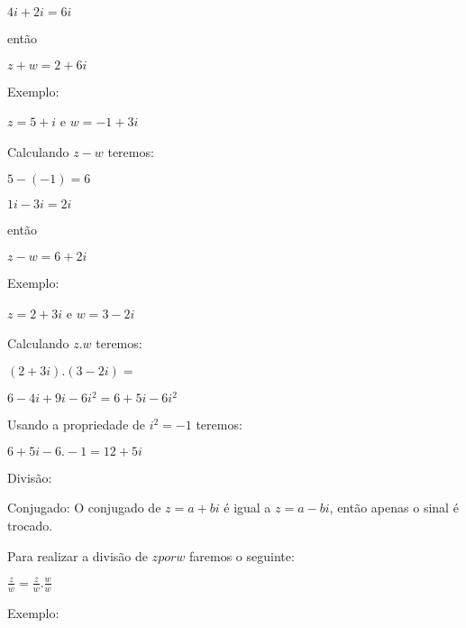 \documentclass[]{article}
\begin{document}
\begin{large}
\begin{flushleft}
\begin{center}
    $4i + 2i = 6i$
    
    então
    
    $z+w = 2+6i$
\end{center}

Exemplo: \vspace{.3cm}

\begin{center}
    $z = 5+i$ e $w = -1+3i$
\end{center}

Calculando $z-w$ teremos: \vspace{.3cm}

\begin{center}
    $5-(-1) = 6$
    
    $1i - 3i = 2i$
    
    então
    
    $z-w = 6+2i$
\end{center}

Exemplo: \vspace{.3cm}

\begin{center}
    $z=2+3i$ e $w=3-2i$
\end{center}

Calculando $z.w$ teremos: \vspace{.3cm}

\begin{center}
    $(2+3i).(3-2i)=$
    
    $6-4i+9i-6i^2=6+5i-6i^2$
    
\end{center}

Usando a propriedade de $i^2 = -1$ teremos: \vspace{.3cm}

\begin{center}
    $6+5i-6.-1= 12+5i$
\end{center}

Divisão: \vspace{.3cm}

Conjugado: O conjugado de $z=a+bi$ é igual a $z=a-bi$, então apenas o sinal é trocado.

Para realizar a divisão de $z por w$ faremos o seguinte: \vspace{.3cm}

\begin{center}
    $\frac{z}{w} = \frac{z}{w}.\frac{w}{w}$
\end{center}

Exemplo: \vspace{.3cm}


\end{flushleft}
\end{large}
\end{document}
